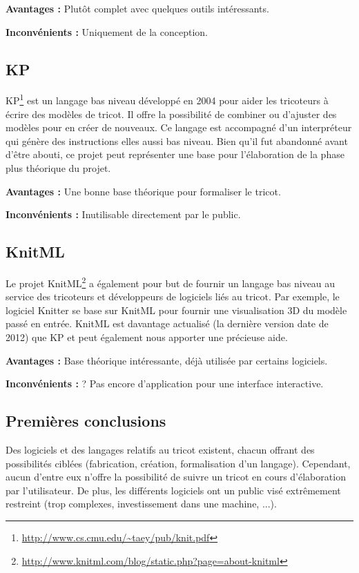 \documentclass{article}
\begin{document}
\textbf{Avantages : } Plutôt complet avec quelques outils intéressants.

\textbf{Inconvénients : } Uniquement de la conception.

\subsection{KP}

KP\footnote{\url{http://www.cs.cmu.edu/~taey/pub/knit.pdf}} est un langage bas niveau développé en 2004 pour aider les tricoteurs à écrire
des modèles de tricot. Il offre la possibilité de combiner ou d'ajuster des modèles pour en créer de nouveaux. Ce langage est accompagné
d'un interpréteur qui génère des instructions elles aussi bas niveau. Bien qu'il fut abandonné avant d'être abouti, ce projet peut
représenter une base pour l'élaboration de la phase plus théorique du projet.


\textbf{Avantages : } Une bonne base théorique pour formaliser le tricot.

\textbf{Inconvénients : } Inutilisable directement par le public.

\subsection{KnitML}

Le projet KnitML\footnote{\url{http://www.knitml.com/blog/static.php?page=about-knitml}} a également pour but de fournir un langage bas
niveau au service des tricoteurs et développeurs de logiciels liés au tricot. Par exemple, le logiciel Knitter se base sur KnitML pour
fournir une visualisation 3D du modèle passé en entrée. KnitML est davantage actualisé (la dernière version date de 2012) que KP et peut
également nous apporter une précieuse aide.

\textbf{Avantages : } Base théorique intéressante, déjà utilisée par certains logiciels.

\textbf{Inconvénients : } ? Pas encore d'application pour une interface interactive.

\subsection{Premières conclusions}

Des logiciels et des langages relatifs au tricot existent, chacun offrant des possibilités ciblées (fabrication, création, formalisation
d'un langage). Cependant, aucun d'entre eux n'offre la possibilité de suivre un tricot en cours d'élaboration par l'utilisateur. De plus,
les différents logiciels ont un public visé extrêmement restreint (trop complexes, investissement dans une machine, ...).
\end{document}
